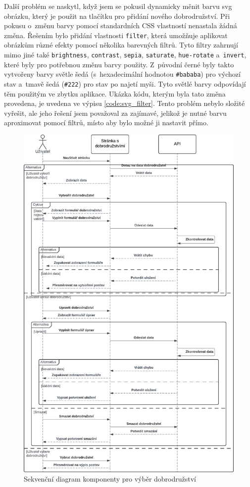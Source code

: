 Další problém se naskytl, když jsem se pokusil dynamicky měnit barvu svg obrázku, který je použit na tlačítku pro přidání nového dobrodružství. Při pokusu o~změnu barvy pomocí standardních CSS vlastností nenastala žádná změna. Řešením bylo přidání vlastnosti \texttt{filter}, která umožňuje aplikovat obrázkům různé efekty pomocí několika barevných filtrů. Tyto filtry zahrnují mimo jiné také \texttt{brightness}, \texttt{contrast}, \texttt{sepia}, \texttt{saturate}, \texttt{hue-rotate} a~\texttt{invert}, které byly pro potřebnou změnu barvy použity. Z~původní černé byly takto vytvořeny barvy světle šedá (s~hexadecimální hodnotou \texttt{\#bababa}) pro výchozí stav a~tmavě šedá (\texttt{\#222}) pro stav po najetí myši. Tyto světlé barvy odpovídají těm použitým ve zbytku aplikace. Ukázka kódu, kterým byla tato změna provedena, je uvedena ve výpisu \ref{code:svg_filter}. Tento problém nebylo složité vyřešit, ale jeho řešení jsem považoval za zajímavé, jelikož je nutné barvu aproximovat pomocí filtrů, místo aby bylo možné ji nastavit přímo.

\begin{figure}[htbp]
  \centering
  \includegraphics[width=.80\textwidth]{resources/figures/adventure_diagram.pdf}
  \caption{Sekvenční diagram komponenty pro výběr dobrodružství}
  \label{fig:adventure_diagram}
\end{figure}

